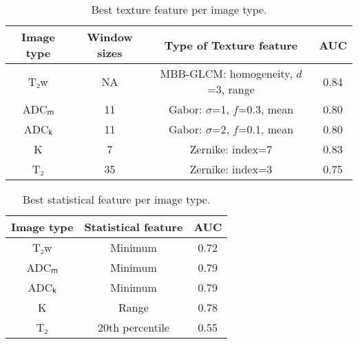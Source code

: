 \begin{table}[ht]
  \caption{Best texture feature per image type.}
  \label{tab:texture_imagetype}

  \begin{tabular}{c c c c}
  \hline
  Image type & Window sizes & Type of Texture feature & AUC \\
  \hline
  T₂w & NA & MBB-GLCM\@: homogeneity, $d$=3, range & 0.84 \\
  ADCₘ & 11 & Gabor: $\sigma$=1, $f$=0.3, mean & 0.80 \\
  ADCₖ & 11 & Gabor: $\sigma$=2, $f$=0.1, mean & 0.80 \\
  K & 7 & Zernike: index=7 & 0.83 \\
  T₂ & 35 & Zernike: index=3 & 0.75 \\
  \hline
  \end{tabular}
\end{table}


\begin{table}[ht]
  \caption{Best statistical feature per image type.}
  \label{tab:stats_imagetype}

  \begin{tabular}{c c c}
  \hline
  Image type & Statistical feature & AUC \\
  \hline
  T₂w & Minimum & 0.72 \\
  ADCₘ & Minimum & 0.79 \\
  ADCₖ & Minimum & 0.79 \\
  K & Range & 0.78 \\
  T₂ & 20th percentile & 0.55 \\
  \hline
  \end{tabular}
\end{table}

